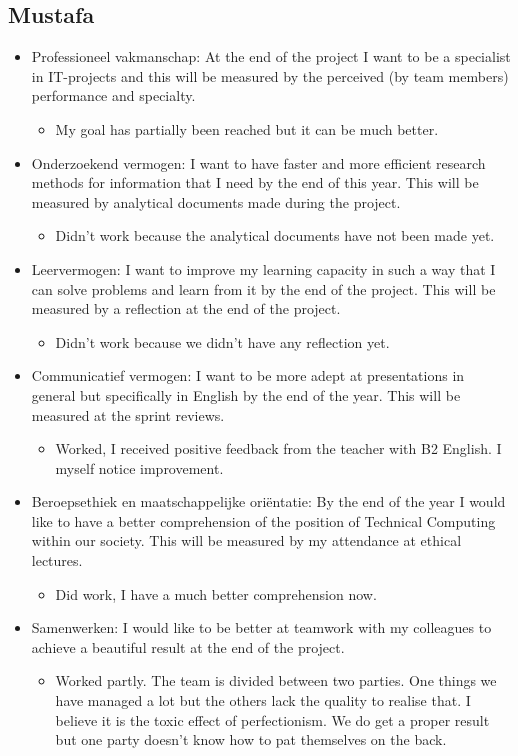 \documentclass[12pt]{article}
\begin{document}
	\subsection{Mustafa}
	\begin{itemize}
		\item Professioneel vakmanschap: At the end of the project I want to be a specialist in IT-projects and this will be measured by the perceived (by team members) performance and specialty.  
		\begin{itemize}
			\item My goal has partially been reached but it can be much better.
		\end{itemize}
		\item Onderzoekend vermogen: I want to have faster and more efficient research methods for information that I need by the end of this year. This will be measured by analytical documents made during the project.
		\begin{itemize}
			\item Didn't work because the analytical documents have not been made yet.
		\end{itemize}
		\item Leervermogen: I want to improve my learning capacity in such a way that I can solve problems and learn from it by the end of the project. This will be measured by a reflection at the end of the project.
		\begin{itemize}
			\item Didn't work because we didn't have any reflection yet.
		\end{itemize}
		\item Communicatief vermogen: 
		I want to be more adept at presentations in general but specifically in English by the end of the year. This will be measured at the sprint reviews.
		\begin{itemize}
			\item 	Worked, I received positive feedback from the teacher with B2 English. I myself notice improvement.
		\end{itemize} 
		\item Beroepsethiek en maatschappelijke oriëntatie: By the end of the year I would like to have a better comprehension of the position of Technical Computing within our society. This will be measured by my attendance at ethical lectures.
		\begin{itemize}
			\item Did work, I have a much better comprehension now.
		\end{itemize}
		\item Samenwerken: I would like to be better at teamwork with my colleagues to achieve a beautiful result at the end of the project. 
		\begin{itemize}
			\item Worked partly. The team is divided between two parties. One things we have managed a lot but the others lack the quality to realise that. I believe it is the toxic effect of perfectionism. We do get a proper result but one party doesn't know how to pat themselves on the back.  
		\end{itemize}
	\end{itemize}
\end{document}
